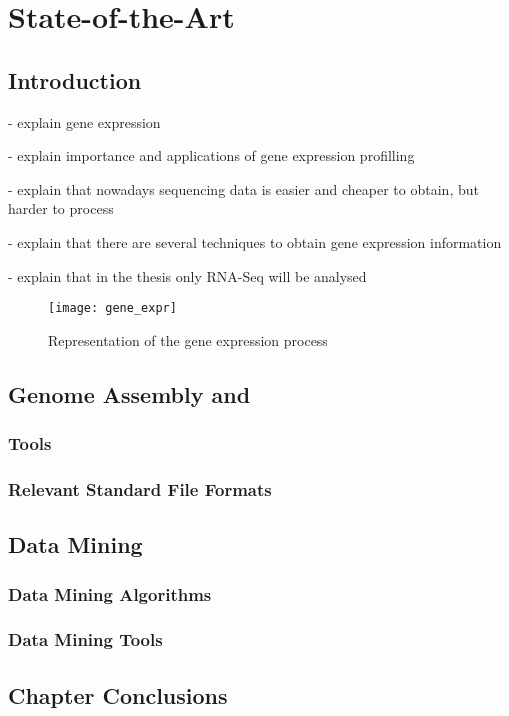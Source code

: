 \chapter{State-of-the-Art} \label{chap:sota}

\section*{}

\section{Introduction}

- explain gene expression

- explain importance and applications of gene expression profilling

- explain that nowadays sequencing data is easier and cheaper to obtain, but
  harder to process

- explain that there are several techniques to obtain gene expression
  information

- explain that in the thesis only RNA-Seq will be analysed

\begin{figure}[!htb]
  \begin{center}
    \leavevmode
    \texttt{[image: gene\_expr]}
    \caption{Representation of the gene expression process\protect\footnotemark}
    \label{fig:arch}
  \end{center}
\end{figure}

\section{Genome Assembly and \rnaseq}\label{sec:assembly}

\subsection{\rnaseq{} Tools}\label{sec:seqtools}

\subsection{Relevant Standard File Formats}\label{sec:formats}

\section{Data Mining}\label{sec:mlearning}

\subsection{Data Mining Algorithms}\label{sec:minalgo}

\subsection{Data Mining Tools}\label{sec:mintools}

\section{Chapter Conclusions}
